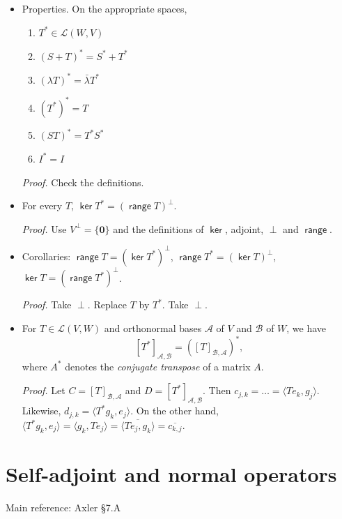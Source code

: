 \documentclass[11pt]{article}
\newcommand{\1}{\mathbf{1}}
\newcommand{\inner}[2]{\langle #1, #2 \rangle}
\newcommand{\0}{\mathbf{0}}
\DeclareMathOperator{\myrange}{\mathsf{range}}
\DeclareMathOperator{\myker}{\mathsf{ker}}
\begin{document}
{\begin{itemize}
\item

Properties. On the appropriate spaces,

\begin{enumerate}
\item
$T^*\in\mathcal{L}(W,V)$
\item
$(S+T)^*=S^*+T^*$
\item
$(\lambda T)^*=\bar{\lambda}T^*$
\item
$(T^*)^*=T$
\item
$(ST)^*=T^*S^*$
\item
$I^* = I$
\end{enumerate}
\emph{Proof.}
Check the definitions.

\item
For every $T$, $\myker T^*=(\myrange T)^\perp$.

\emph{Proof.}
Use $V^\perp = \{\0\}$ and the definitions of $\myker$, adjoint, $\perp$ and $\myrange$.

\item
Corollaries:
$\myrange T = (\myker T^*)^\perp$,
$\myrange T^* = (\myker T)^\perp$,
$\myker T=(\myrange T^*)^\perp$.

\emph{Proof.}
Take $\perp$. Replace $T$ by $T^*$. Take $\perp$.

\item

For $T\in\mathcal{L}(V,W)$ and orthonormal bases $\mathcal{A}$ of $V$ and $\mathcal{B}$ of $W$, we have
$$
[T^*]_{\mathcal{A},\mathcal{B}}= ([T]_{\mathcal{B},\mathcal{A}})^*,
$$
where $A^*$ denotes the \emph{conjugate transpose} of a matrix $A$.

\emph{Proof.}
Let $C=[T]_{\mathcal{B},\mathcal{A}}$ and $D=[T^*]_{\mathcal{A},\mathcal{B}}$.
Then $c_{j,k} = \dots = \inner{Te_k}{g_j}$.
Likewise, $d_{j,k} = \inner{T^* g_k}{e_j}$.
On the other hand,
$\inner{T^* g_k}{e_j}=\inner{g_k}{T e_j}=\overline{\inner{T e_j}{g_k}}=\overline{c_{k,j}}$.

\end{itemize}


\clearpage
\section{Self-adjoint and normal operators}

Main reference:
Axler \S7.A


\begin{itemize}


\end{itemize}}
\end{document}
